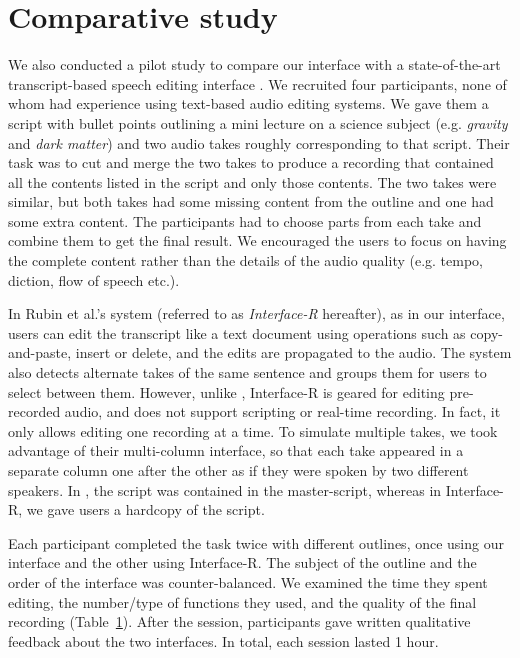 \section{Comparative study}
We also conducted a pilot study to compare our interface with
a state-of-the-art transcript-based speech editing interface
\cite{rubin2013content}. We recruited four participants, none of whom had
experience using text-based audio editing systems. We gave them
a script with bullet points outlining a mini lecture on a science
subject (e.g. \textit{gravity} and \textit{dark matter}) and
two audio takes roughly corresponding to that script. Their task
was to cut and merge the two takes to produce a recording that
contained all the contents listed in the script and only those
contents. The two takes were similar, but both takes had some
missing content from the outline and one had some extra
content. The participants had to choose parts from each take
and combine them to get the final result. We encouraged the users
to focus on having the complete content rather than the details
of the audio quality (e.g. tempo, diction, flow of speech etc.).

In Rubin et al.'s system (referred to as
\textit{Interface-R} hereafter), as in our interface, users
can edit the transcript like a text document using operations
such as copy-and-paste, insert or delete, and the edits are propagated
to the audio. The system  also detects alternate takes of the
same sentence and groups them for users to select between them.
However, unlike \systemname , Interface-R is geared for editing pre-recorded
audio, and does not support scripting or real-time recording.
In fact, it only allows editing one recording at a time. To simulate multiple takes, we took advantage of their multi-column interface, so that each take appeared in a separate column one after the other as if they were spoken by two different speakers. In \systemname,  the script was contained in the master-script, whereas in Interface-R, we gave users a hardcopy of the script.

Each participant completed the task twice with different outlines,
once using our interface and the other using Interface-R.
The subject of the outline and the order of the interface was
counter-balanced. We examined the time they spent editing,
the number/type of functions they used, and the quality of the
final recording (Table~\ref{}). After the session, participants gave written
qualitative feedback about the two interfaces. In total, each
session lasted 1 hour.
   
